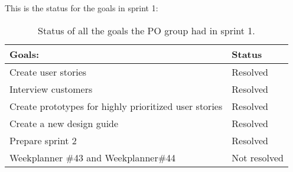 \noindent
This is the status for the goals in sprint 1:
\begin{table}[H]
    \centering
    \begin{tabular}{|l|l|}
    \hline
    Goals:                                 & Status   \\ \hline
    Create user stories                    & Resolved \\ \hline
    Interview customers                    & Resolved \\ \hline
    Create prototypes for highly prioritized user stories & Resolved \\ \hline
    Create a new design guide                & Resolved \\ \hline
    Prepare sprint 2                       & Resolved \\ \hline
    Weekplanner \#43 and Weekplanner\#44                       & Not resolved \\ \hline
    \end{tabular}
    \caption{Status of all the goals the PO group had in sprint 1.}
    \label{PO-goal-review-sprint-1}
\end{table}

